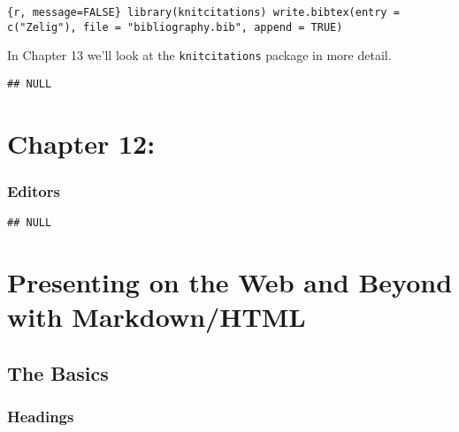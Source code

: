 \documentclass[ChapterTOCs,krantz1]{krantz}\usepackage{graphicx, color}
\makeatletter
\newenvironment{kframe}{%
 \def\at@end@of@kframe{}%
 \ifinner\ifhmode%
  \def\at@end@of@kframe{\end{minipage}}%
  \begin{minipage}{\columnwidth}%
 \fi\fi%
 \def\FrameCommand##1{\hskip\@totalleftmargin \hskip-\fboxsep
 \colorbox{shadecolor}{##1}\hskip-\fboxsep
     \hskip-\linewidth \hskip-\@totalleftmargin \hskip\columnwidth}%
 \MakeFramed {\advance\hsize-\width
   \@totalleftmargin\z@ \linewidth\hsize
   \@setminipage}}%
 {\par\unskip\endMakeFramed%
 \at@end@of@kframe}
\newenvironment{knitrout}{}{} %
\makeatother
\begin{document}
\texttt{\{r, message=FALSE\} library(knitcitations) write.bibtex(entry = c("Zelig"), file = "bibliography.bib", append = TRUE)}

In Chapter 13 we'll look at the \texttt{knitcitations} package in more
detail.

\begin{knitrout}
\color{fgcolor}\begin{kframe}
\begin{verbatim}
## NULL
\end{verbatim}
\end{kframe}
\end{knitrout}


\chapter{Chapter 12:}

\subsection{Editors}


\begin{knitrout}
\color{fgcolor}\begin{kframe}
\begin{verbatim}
## NULL
\end{verbatim}
\end{kframe}
\end{knitrout}


\chapter{Presenting on the Web and Beyond with Markdown/HTML}

\section{The Basics}

\subsection{Headings}
\end{document}
